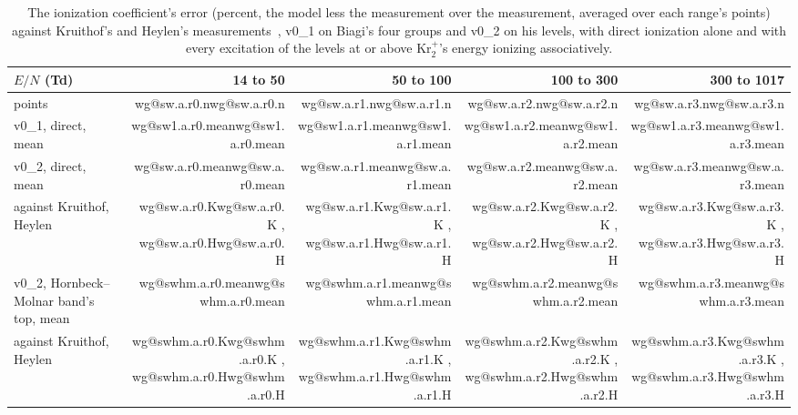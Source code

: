 \documentclass[11pt]{article}
\makeatletter
\newcommand\wg[1]{\ifcsname wg@#1\endcsname\csname wg@#1\endcsname
  \else\errmessage{no overview number '#1'. Rerun make_overview_v0_2.py}\fi}
\newcommand{\Krtp}{Kr\ensuremath{_2^+}}
\makeatother
\begin{document}
\begin{table}[H]
\centering\footnotesize
\begin{tabular}{@{}lrrrr@{}}
\toprule
$E/N$ (Td) & 14 to 50 & 50 to 100 & 100 to 300 & 300 to 1017\\
\midrule
points & \wg{sw.a.r0.n} & \wg{sw.a.r1.n} & \wg{sw.a.r2.n} & \wg{sw.a.r3.n}\\
v0\_1, direct, mean & \wg{sw1.a.r0.mean} & \wg{sw1.a.r1.mean} & \wg{sw1.a.r2.mean} & \wg{sw1.a.r3.mean}\\
v0\_2, direct, mean & \wg{sw.a.r0.mean} & \wg{sw.a.r1.mean} & \wg{sw.a.r2.mean} & \wg{sw.a.r3.mean}\\
\quad against Kruithof, Heylen & \wg{sw.a.r0.K}, \wg{sw.a.r0.H} & \wg{sw.a.r1.K}, \wg{sw.a.r1.H} & \wg{sw.a.r2.K}, \wg{sw.a.r2.H} & \wg{sw.a.r3.K}, \wg{sw.a.r3.H}\\
v0\_2, Hornbeck--Molnar band's top, mean & \wg{swhm.a.r0.mean} & \wg{swhm.a.r1.mean} & \wg{swhm.a.r2.mean} & \wg{swhm.a.r3.mean}\\
\quad against Kruithof, Heylen & \wg{swhm.a.r0.K}, \wg{swhm.a.r0.H} & \wg{swhm.a.r1.K}, \wg{swhm.a.r1.H} & \wg{swhm.a.r2.K}, \wg{swhm.a.r2.H} & \wg{swhm.a.r3.K}, \wg{swhm.a.r3.H}\\
\bottomrule
\end{tabular}
\caption{The ionization coefficient's error (percent, the model less the
measurement over the measurement, averaged over each range's points)
against Kruithof's and Heylen's measurements~\cite{kruithof40,heylen71},
v0\_1 on Biagi's four groups and v0\_2 on his levels, with direct
ionization alone and with every excitation of the levels at or above
\Krtp's energy ionizing associatively.}
\label{tab:alpha}
\end{table}
\end{document}
